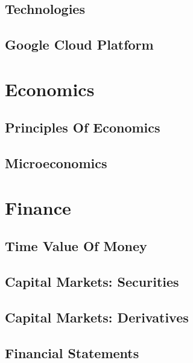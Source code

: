 \documentclass[a4paper, notitlepage]{report}
\begin{document}
\chapter{Technologies}


\chapter{Google Cloud Platform}


\part{Economics}

\chapter{Principles Of Economics}


\chapter{Microeconomics}


\part{Finance}

\chapter{Time Value Of Money}


\chapter{Capital Markets: Securities}


\chapter{Capital Markets: Derivatives}


\chapter{Financial Statements}


\begin{appendices}

\end{appendices}
\end{document}
